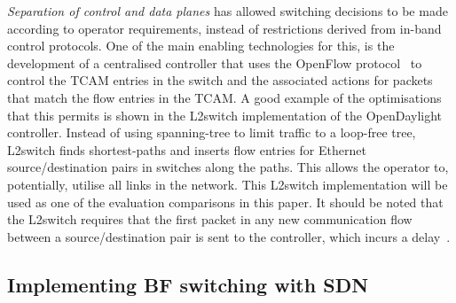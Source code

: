 \documentclass[conference]{IEEEtran}
\begin{document}
\emph{Separation of control and data planes} has allowed switching decisions to be made according to operator requirements, instead of restrictions derived from in-band control protocols. One of the main enabling technologies for this, is the development of a centralised controller that uses the OpenFlow protocol~\cite{OpenFlow1.2} to control the TCAM entries in the switch and the associated actions for packets that match the flow entries in the TCAM. A good example of the optimisations that this permits is shown in the L2switch implementation of the OpenDaylight controller\cite{OpenDaylight}. Instead of using spanning-tree to limit traffic to a loop-free tree, L2switch finds shortest-paths and inserts flow entries for Ethernet source/destination pairs in switches along the paths. This allows the operator to, potentially, utilise all links in the network. This L2switch implementation will be used as one of the evaluation comparisons in this paper. It should be noted that the L2switch requires that the first packet in any new communication flow between a source/destination pair is sent to the controller, which incurs a delay~\cite{Kreutz2015}.

\subsection{Implementing BF switching with SDN}
\label{sec:bf-sdn}
\end{document}
